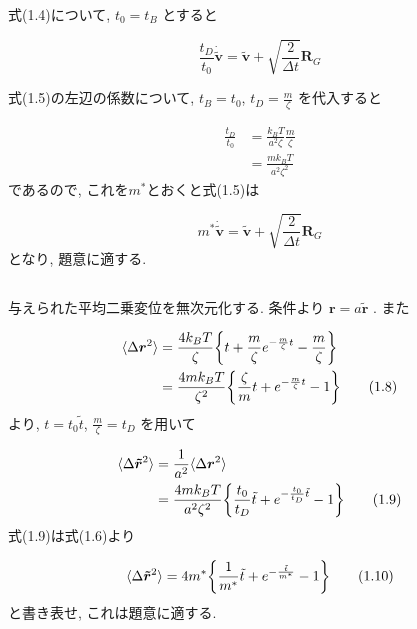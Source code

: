 \documentclass[a4paper,dvipdfmx]{jarticle}
\begin{document}
\noindent
式(1.4)について, $t_0=t_B$ とすると

\begin{equation}
    \frac{t_D}{t_0} \bm{\dot{\tilde{v}}} = \bm{\tilde{v}} 
    + \sqrt{\frac{2}{\Delta t}}\bm{R}_G \tag{1.5} 
\end{equation}

\noindent
式(1.5)の左辺の係数について, $t_B=t_0$, $t_D=\frac{m}{\zeta}$ を代入すると

\begin{align*}
    \frac{t_D}{t_0} &= \frac{k_BT}{a^2\zeta} \frac{m}{\zeta} \\
    &= \frac{mk_BT}{a^2\zeta^2} \tag{1.6}
\end{align*}
であるので, これを$m^*$とおくと式(1.5)は

\begin{equation}
    m^* \bm{\dot{\tilde{v}}} = \bm{\tilde{v}} 
    + \sqrt{\frac{2}{\Delta t}}\bm{R}_G \tag{1.7} 
\end{equation}
となり, 題意に適する.


\subsection{}
\noindent
与えられた平均二乗変位を無次元化する.
条件より $\bm{r}=a\bm{\tilde{r}}$ .
また

\begin{align*}
    \langle \Delta \bm{r}^2 \rangle 
    &= \frac{4k_BT}{\zeta} \qty{t + \frac{m}{\zeta} e^{-\frac{m}{\zeta}t} - \frac{m}{\zeta}} \\
    &= \frac{4mk_BT}{\zeta^2} \qty{\frac{\zeta}{m} t + e^{-\frac{m}{\zeta}t} - 1} \tag{1.8}
\end{align*}
より, $t=t_0\tilde{t}$, $\frac{m}{\zeta}=t_D$ を用いて

\begin{align*}
    \langle \Delta \bm{\tilde{r}}^2 \rangle &=  \frac{1}{a^2} \langle \Delta \bm{r}^2 \rangle \\
    &= \frac{4mk_BT}{a^2\zeta^2} \qty{\frac{t_0}{t_D} \tilde{t} + e^{-\frac{t_0}{t_D} \tilde{t}} - 1} \tag{1.9}
\end{align*}
式(1.9)は式(1.6)より

\begin{equation}
        \langle \Delta \bm{\tilde{r}}^2 \rangle 
        = 4m^* \qty{\frac{1}{m^*} \tilde{t} + e^{-\frac{\tilde{t}}{m^*}} - 1} \tag{1.10}
\end{equation}
と書き表せ, これは題意に適する.
\end{document}
